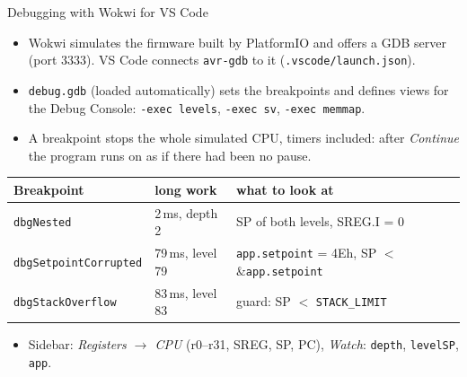 \begin{frame}{Debugging with Wokwi for VS Code}
  \begin{itemize}
    \item Wokwi simulates the firmware built by PlatformIO and offers a GDB server (port 3333). VS Code connects \texttt{avr-gdb} to it (\texttt{.vscode/launch.json}).
    \item \texttt{debug.gdb} (loaded automatically) sets the breakpoints and defines views for the Debug Console: \texttt{-exec levels}, \texttt{-exec sv}, \texttt{-exec memmap}.
    \item A breakpoint stops the whole simulated CPU, timers included: after \emph{Continue} the program runs on as if there had been no pause.
  \end{itemize}
  \begin{center}\footnotesize
  \begin{tabular}{@{}lll@{}}
    \toprule
    Breakpoint & long work & what to look at \\
    \midrule
    \texttt{dbgNested} & 2\,ms, depth 2 & SP of both levels, SREG.I = 0 \\
    \texttt{dbgSetpointCorrupted} & 79\,ms, level 79 & \texttt{app.setpoint} = 4Eh, SP $<$ \&\texttt{app.setpoint} \\
    \texttt{dbgStackOverflow} & 83\,ms, level 83 & guard: SP $<$ \texttt{STACK\_LIMIT} \\
    \bottomrule
  \end{tabular}
  \end{center}
  \begin{itemize}
    \item Sidebar: \emph{Registers $\to$ CPU} (r0--r31, SREG, SP, PC), \emph{Watch}: \texttt{depth}, \texttt{levelSP}, \texttt{app}.
  \end{itemize}
\end{frame}

